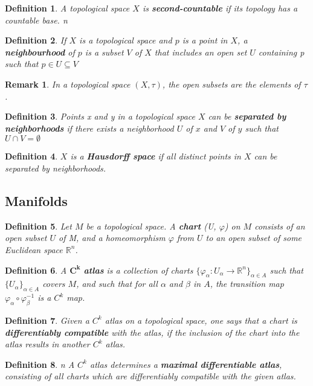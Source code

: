 \documentclass[12pt]{article}
\newcommand{\real}{\mathbb{R}}
\newcommand\inv[1]{#1^{-1}}
\newcommand\set[1]{\{#1\}}
\newtheorem{defn}{Definition}[thm]
\newtheorem*{remark}{Remark}
\begin{document}
\begin{defn}
  A topological space $X$ is \textbf{second-countable} if its topology has a countable base.
n\end{defn}

\begin{defn}
  If $X$ is a topological space and $p$ is a point in $X$, a \textbf{neighbourhood}
  of $p$ is a subset $V$ of $X$ that includes an open set $U$ containing p such that $ p \in U \subseteq V$
\end{defn}
\begin{remark}
  In a topological space $(X, \tau)$, the open subsets are the elements of $\tau$.
\end{remark}
\begin{defn}
  Points x and y in a topological space $X$ can be \textbf{separated by neighborhoods}
  if there exists a neighborhood $U$ of $x$ and $V$ of $y$ such that $U \cap V = \emptyset$
\end{defn}
\begin{defn}
  $X$ is a \textbf{Hausdorff space} if all distinct points in $X$ can be separated by neighborhoods.
\end{defn}

\subsection{Manifolds}

\begin{defn}
  Let $M$  be a topological space. A \textbf{chart} (U, $\varphi$) on $M$ consists of an open subset $U$ of M, and a homeomorphism $\varphi$ from $U$ to an open subset of some Euclidean space $\real^n$.
\end{defn}
  
\begin{defn}
  A $\mathbf{C^k}$ \textbf{atlas} is a collection of charts $\set{\varphi_{\alpha} : U_{\alpha} \to  \real^n}_{\alpha \in A}$ such that $\set{U_{\alpha}}_{\alpha \in A}$  covers $M$, and such  that for all  $\alpha$
  and $\beta$ in $A$, the transition map $\varphi_{\alpha} \circ \inv{\varphi_{\beta}}$ is a $C^k$ map.
\end{defn}


\begin{defn}
  Given a $C^k$ atlas on a topological  space, one says that a chart is \textbf{differentiably compatible} with the atlas, if the  inclusion of the chart into the atlas results in another $C^k$  atlas.
\end{defn}
\begin{defn}n
  A $C^k$ atlas determines a \textbf{maximal differentiable atlas}, consisting of all charts which are differentiably compatible with the given atlas.
\end{defn}
\end{document}
